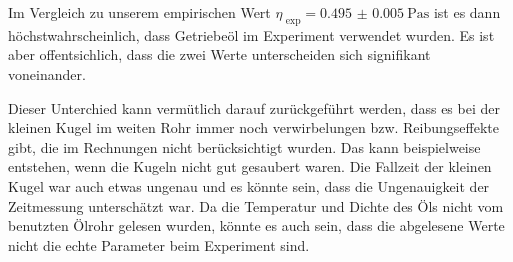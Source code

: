 		Im Vergleich zu unserem empirischen Wert $\eta_\text{~exp} = \SI{0.495(5)}{\pascal\second}$ ist es dann höchstwahrschein\-lich, dass Getriebeöl im Experiment verwendet wurden. Es ist aber offentsichlich, dass die zwei Werte unterscheiden sich signifikant voneinander.

		Dieser Unterchied kann vermütlich darauf zurückgeführt werden, dass es bei der kleinen Kugel im weiten Rohr immer noch verwirbelungen bzw. Reibungseffekte gibt, die im Rechnungen nicht berücksichtigt wurden. Das kann beispielweise entstehen, wenn die Kugeln nicht gut gesaubert waren. Die Fallzeit der kleinen Kugel war auch etwas ungenau und es könnte sein, dass die Ungenauigkeit der Zeitmessung unterschätzt war. Da die Temperatur und Dichte des Öls nicht vom benutzten Ölrohr gelesen wurden, könnte es auch sein, dass die abgelesene Werte nicht die echte Parameter beim Experiment sind. 